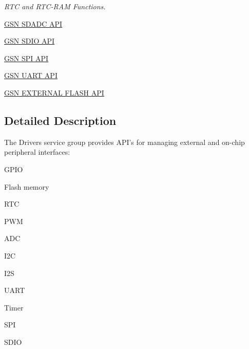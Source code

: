 \begin{DoxyCompactItemize}
\begin{DoxyCompactList}\small\item\em RTC and RTC-\/RAM Functions. \end{DoxyCompactList}

\item 
\hyperlink{a00652}{GSN SDADC API}
\item 
\hyperlink{a00653}{GSN SDIO API}
\item 
\hyperlink{a00655}{GSN SPI API}
\item 
\hyperlink{a00656}{GSN UART API}
\item 
\hyperlink{a00664}{GSN EXTERNAL FLASH API}
\end{DoxyCompactItemize}


\subsection{Detailed Description}
The Drivers service group provides API's for managing external and on-\/chip peripheral interfaces:
\begin{DoxyItemize}
\item GPIO
\item Flash memory
\item RTC
\item PWM
\item ADC
\item I2C
\item I2S
\item UART
\item Timer
\item SPI
\item SDIO 
\end{DoxyItemize}